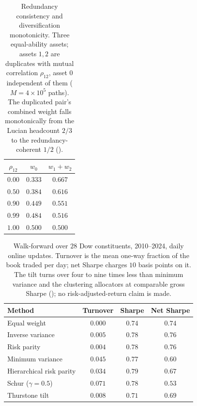 \documentclass[11pt]{article}
\begin{document}
\begin{table}[p]
  \centering
  \caption{Redundancy consistency and diversification monotonicity. Three
  equal-ability assets; assets $1,2$ are duplicates with mutual correlation
  $\rho_{12}$, asset $0$ independent of them ($M = 4\times10^5$ paths). The
  duplicated pair's combined weight falls monotonically from the Lucian
  headcount $2/3$ to the redundancy-coherent $1/2$
  ().}
  \label{tab:redundancy}
  \begin{tabular}{ccc}
    \toprule
    $\rho_{12}$ & $w_0$ & $w_1 + w_2$ \\
    \midrule
    $0.00$ & $0.333$ & $0.667$ \\
    $0.50$ & $0.384$ & $0.616$ \\
    $0.90$ & $0.449$ & $0.551$ \\
    $0.99$ & $0.484$ & $0.516$ \\
    $1.00$ & $0.500$ & $0.500$ \\
    \bottomrule
  \end{tabular}
\end{table}

\begin{table}[p]
  \centering
  \caption{Walk-forward over $28$ Dow constituents, 2010--2024, daily online
  updates. Turnover is the mean one-way fraction of the book traded per day;
  net Sharpe charges $10$ basis points on it. The tilt turns over four to nine
  times less than minimum variance and the clustering allocators at comparable
  gross Sharpe (); no risk-adjusted-return claim is made.}
  \label{tab:dow}
  \begin{tabular}{lccc}
    \toprule
    Method & Turnover & Sharpe & Net Sharpe \\
    \midrule
    Equal weight              & $0.000$ & $0.74$ & $0.74$ \\
    Inverse variance          & $0.005$ & $0.78$ & $0.76$ \\
    Risk parity               & $0.004$ & $0.78$ & $0.76$ \\
    Minimum variance          & $0.045$ & $0.77$ & $0.60$ \\
    Hierarchical risk parity  & $0.034$ & $0.79$ & $0.67$ \\
    Schur ($\gamma=0.5$)      & $0.071$ & $0.78$ & $0.53$ \\
    Thurstone tilt            & $0.008$ & $0.71$ & $0.69$ \\
    \bottomrule
  \end{tabular}
\end{table}
\end{document}
